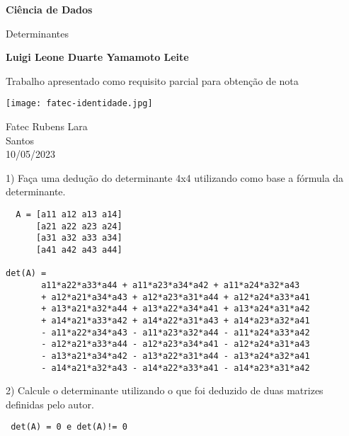 \documentclass{article}
\begin{document}
\begin{titlepage}
    \begin{center}
        \vspace*{1cm}
        
        \Huge
        \textbf{Ciência de Dados}
        
        \vspace{0.5cm}
        \LARGE
        Determinantes 
        
        \vspace{1.5cm}
        
        \textbf{Luigi Leone Duarte Yamamoto Leite}
        
        \vfill
        
        \begin{flushright}
              Trabalho apresentado como requisito parcial para obtenção de nota 
        \end{flushright}
      
        \vspace{0.8cm}
        
        \Large
    
        
        \vspace{0.8cm}
        
        \texttt{[image: fatec-identidade.jpg]}
        
        \Large
        Fatec Rubens Lara\\
        Santos\\
        10/05/2023
        
    \end{center}
\end{titlepage}
\clearpage

1) Faça uma dedução do determinante 4x4 utilizando como base a fórmula da determinante.
 \begin{lstlisting}
  A = [a11 a12 a13 a14]
      [a21 a22 a23 a24]
      [a31 a32 a33 a34]
      [a41 a42 a43 a44]

det(A) = 
       a11*a22*a33*a44 + a11*a23*a34*a42 + a11*a24*a32*a43
       + a12*a21*a34*a43 + a12*a23*a31*a44 + a12*a24*a33*a41
       + a13*a21*a32*a44 + a13*a22*a34*a41 + a13*a24*a31*a42
       + a14*a21*a33*a42 + a14*a22*a31*a43 + a14*a23*a32*a41
       - a11*a22*a34*a43 - a11*a23*a32*a44 - a11*a24*a33*a42
       - a12*a21*a33*a44 - a12*a23*a34*a41 - a12*a24*a31*a43
       - a13*a21*a34*a42 - a13*a22*a31*a44 - a13*a24*a32*a41
       - a14*a21*a32*a43 - a14*a22*a33*a41 - a14*a23*a31*a42

\end{lstlisting}
2) Calcule o determinante utilizando o que foi deduzido de duas matrizes definidas pelo autor.
\begin{lstlisting}
 det(A) = 0 e det(A)!= 0
\end{lstlisting}
\end{document}
